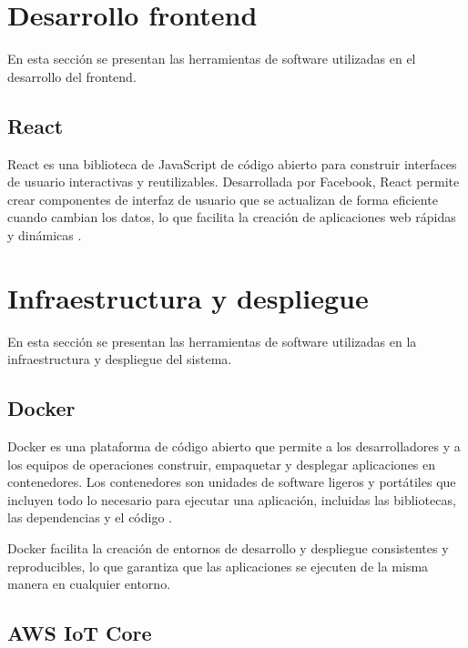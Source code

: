 \section{Desarrollo frontend}

En esta sección se presentan las herramientas de software utilizadas en el
desarrollo del frontend.

\subsection{React}

React es una biblioteca de JavaScript de código abierto para construir interfaces
de usuario interactivas y reutilizables. Desarrollada por Facebook, React
permite crear componentes de interfaz de usuario que se actualizan de forma
eficiente cuando cambian los datos, lo que facilita la creación de aplicaciones
web rápidas y dinámicas \cite{React}.


\section{Infraestructura y despliegue}

En esta sección se presentan las herramientas de software utilizadas en la
infraestructura y despliegue del sistema.
\subsection{Docker}

Docker es una plataforma de código abierto que permite a los desarrolladores y
a los equipos de operaciones construir, empaquetar y desplegar aplicaciones en
contenedores. Los contenedores son unidades de software ligeros y portátiles
que incluyen todo lo necesario para ejecutar una aplicación, incluidas las
bibliotecas, las dependencias y el código \cite{Docker}.

Docker facilita la creación de entornos de desarrollo y despliegue consistentes
y reproducibles, lo que garantiza que las aplicaciones se ejecuten de la misma
manera en cualquier entorno.

\subsection{AWS IoT Core}

